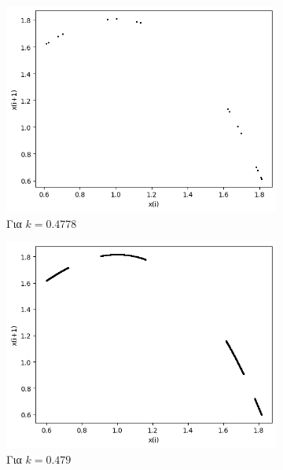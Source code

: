 \begin{figure}[ht]
\begin{subfigure}[b]{0.4\textwidth}
		\includegraphics[width=\textwidth]{LateX images/graphs/k04778}
		\caption{Για $k=0.4778$}
		\label{f:k5}
	\end{subfigure}
	\hfill
	\begin{subfigure}[b]{0.4\textwidth}
		\centering
		\includegraphics[width=\textwidth]{LateX images/graphs/k0479}
		\caption{Για $k=0.479$}
		\label{f:k6}
	\end{subfigure}
	\hfill	
	\begin{subfigure}[b]{0.4\textwidth}
		\centering

\end{subfigure}
\end{figure}
